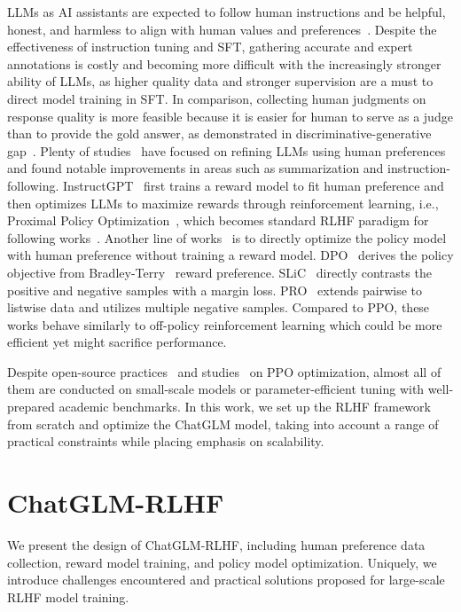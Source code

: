 LLMs as AI assistants are expected to follow human instructions and be helpful, honest, and harmless to align with human values and preferences~\cite{ouyang2022training,bai2022constitutional}. Despite the effectiveness of instruction tuning and SFT, gathering accurate and expert annotations is costly and becoming more difficult with the increasingly stronger ability of LLMs, as higher quality data and stronger supervision are a must to direct model training in SFT. 
In comparison, collecting human judgments on response quality is more feasible because it is easier for human to serve as a judge than to provide the gold answer, as demonstrated in discriminative-generative gap~\cite{zheng2023revisiting}.
Plenty of studies~\cite{touvron2023llama, ouyang2022training,bai2022constitutional,bai2022training,ganguli2023capacity} have focused on refining LLMs using human preferences and found notable improvements in areas such as summarization and instruction-following. 
InstructGPT~\cite{ouyang2022training} first trains a reward model to fit human preference and then optimizes LLMs to maximize rewards through reinforcement learning, i.e., Proximal Policy Optimization~\cite{schulman2017proximal}, which becomes standard RLHF paradigm for following works~\cite{touvron2023llama, bai2022constitutional}. Another line of works~\cite{rafailov2023direct,zhao2023slic,song2023preference} is to directly optimize the policy model with human preference without training a reward model.
DPO~\cite{rafailov2023direct} derives the policy objective from Bradley-Terry~\cite{bradley1952rank} reward preference. 
SLiC~\cite{zhao2023slic} directly contrasts the positive and negative samples with a margin loss. 
PRO~\cite{song2023preference} extends pairwise to listwise data and utilizes multiple negative samples. 
Compared to PPO, these works 
behave similarly to off-policy reinforcement learning which 
could be more efficient yet might sacrifice performance. 

Despite open-source practices~\cite{yao2023deepspeed} and studies~\cite{sun2023salmon,zheng2023secrets} on PPO optimization, almost all of them are conducted on small-scale models or parameter-efficient tuning with well-prepared academic benchmarks. In this work, we set up the RLHF framework from scratch and optimize the ChatGLM model, taking into account a range of practical constraints while placing 
emphasis on scalability.

\section{ChatGLM-RLHF}
We present the design of ChatGLM-RLHF, including human preference data collection, reward model training, and policy model optimization. 
Uniquely, we introduce challenges encountered and practical solutions proposed for large-scale RLHF model training. %

